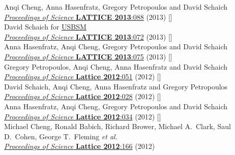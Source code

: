 \begin{spacelist}
\begin{revnumerate}
      Anqi Cheng, Anna Hasenfratz, Gregory Petropoulos and David Schaich \\
      \href{https://doi.org/10.22323/1.187.0088}{\textit{Proceedings of Science} \textbf{LATTICE 2013}:088} (2013) []
    \pagebreakitem
       \\
      David Schaich for \href{http://bsm.physics.yale.edu}{USBSM} \\
      \href{https://doi.org/10.22323/1.187.0072}{\textit{Proceedings of Science} \textbf{LATTICE 2013}:072} (2013) []
    \pagebreakitem
       \\
      Anna Hasenfratz, Anqi Cheng, Gregory Petropoulos and David Schaich \\
      \href{https://doi.org/10.22323/1.187.0075}{\textit{Proceedings of Science} \textbf{LATTICE 2013}:075} (2013) []
    \pagebreakitem
       \\
      Gregory Petropoulos, Anqi Cheng, Anna Hasenfratz and David Schaich \\
      \href{https://doi.org/10.22323/1.164.0051}{\textit{Proceedings of Science} \textbf{Lattice 2012}:051} (2012) []
    \pagebreakitem
       \\
      David Schaich, Anqi Cheng, Anna Hasenfratz and Gregory Petropoulos \\
      \href{https://doi.org/10.22323/1.164.0028}{\textit{Proceedings of Science} \textbf{Lattice 2012}:028} (2012) []
    \pagebreakitem
       \\
      Anna Hasenfratz, Anqi Cheng, Gregory Petropoulos and David Schaich \\
      \href{https://doi.org/10.22323/1.164.0034}{\textit{Proceedings of Science} \textbf{Lattice 2012}:034} (2012) []
    \pagebreakitem
       \\
      Michael Cheng, Ronald Babich, Richard Brower, Michael A.~Clark, Saul D.~Cohen, George T.~Fleming \textit{et al.} \\
      \href{https://doi.org/10.22323/1.164.0166}{\textit{Proceedings of Science} \textbf{Lattice 2012}:166} (2012)

\end{revnumerate}
\end{spacelist}
